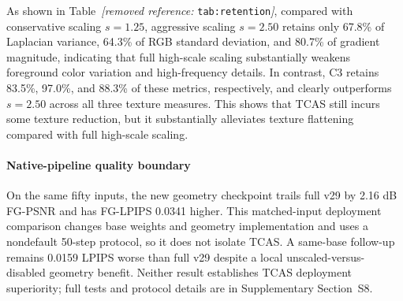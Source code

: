 \documentclass[times,twocolumn,final]{elsarticle}
\providecommand{\DIFadd}[1]{{\protect\color{blue} \sf #1}} %
\providecommand{\DIFdel}[1]{{\protect\color{red} \scriptsize #1}} %
\providecommand{\DIFaddbegin}{} %
\providecommand{\DIFaddend}{} %
\providecommand{\DIFdelbegin}{} %
\providecommand{\DIFdelend}{} %
\begin{document}
\DIFdelbegin %

\DIFdel{As shown in Table~\textit{[removed reference: }\texttt{tab:retention}\textit{]}, compared with conservative scaling $s = 1.25$, aggressive scaling $s = 2.50$ retains only 67.8\% of Laplacian variance, 64.3\% of RGB standard deviation, and 80.7\% of gradient magnitude, indicating that full high-scale scaling substantially weakens foreground color variation and high-frequency details. In contrast, C3 retains 83.5\%, 97.0\%, and 88.3\% of these metrics, respectively, and clearly outperforms $s = 2.50$ across all three texture measures. This shows that TCAS still incurs some texture reduction, but it substantially alleviates texture flattening compared with full high-scale scaling. }\DIFdelend \DIFaddbegin \paragraph{Native-pipeline quality boundary}
\DIFadd{On the same fifty inputs, the new geometry checkpoint trails full v29 by 2.16 dB FG-PSNR and has FG-LPIPS 0.0341 higher. This matched-input deployment comparison changes base weights and geometry implementation and uses a nondefault 50-step protocol, so it does not isolate TCAS. A same-base follow-up remains 0.0159 LPIPS worse than full v29 despite a local unscaled-versus-disabled geometry benefit. Neither result establishes TCAS deployment superiority; full tests and protocol details are in Supplementary Section~S8.
}\DIFaddend
\end{document}
